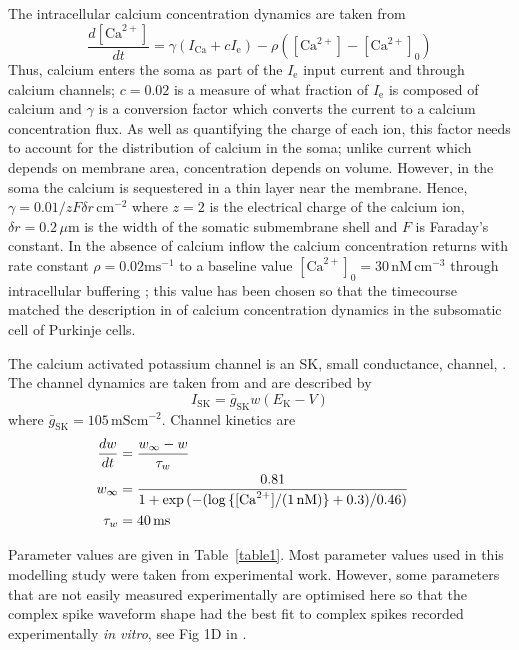 \documentclass[utf8]{frontiersSCNS} %
\newcommand{\msi}{\,\mathrm{mS cm^{-2}}}
\newcommand{\mse}{\,\mathrm{ms}}
\newcommand{\cm}{\,\mathrm{cm}}
\renewcommand{\k}{\mathrm{K}}
\newcommand{\ca}{\mathrm{Ca}}
\newcommand{\sk}{\mathrm{SK}}
\begin{document}
The intracellular calcium concentration dynamics are taken from
\cite{SterrattEtAl2012,KochSegev1998}
\begin{equation}
\label{eq:ca_concentration}
\frac{d[\ca^{2+}]}{dt}=\gamma (I_\ca+cI_{\mathrm{e}})  -
\rho ([\ca^{2+}]-[\ca^{2+}]_0)
\end{equation}
Thus, calcium enters the soma as part of the $I_\mathrm{e}$ input
current and through calcium channels; $c=0.02$ is a measure of what
fraction of $I_{\mathrm{e}}$ is composed of calcium and $\gamma$ is a
conversion factor which converts the current to a calcium
concentration flux. As well as quantifying the charge of each ion,
this factor needs to account for the distribution of calcium in the
soma; unlike current which depends on membrane area, concentration
depends on volume. However, in the soma the calcium is sequestered in
a thin layer near the membrane. Hence, $\gamma=0.01/zF\delta
r\,\mathrm{cm}^{-2}$ where $z=2$ is the electrical charge of the
calcium ion, $\delta r=0.2\,\mu\mathrm{m}$ is the width of the somatic
submembrane shell and $F$ is Faraday's constant. In the absence of
calcium inflow the calcium concentration returns with rate constant
$\rho=0.02\mathrm{ms}^{-1}$ to a baseline value $[\ca^{2+}]_0
=30\,\mathrm{nM}\cm^{-3}$ through intracellular buffering
\cite{FierroEtAl1998,AiraksinenEtAl1997}; this value has been chosen
so that the timecourse matched the description in
\cite{EilersEtAl1995} of calcium concentration dynamics in the
subsomatic cell of Purkinje cells.

The calcium activated potassium channel is an SK, small conductance,
channel, \cite{LancasterEtAl1991}. The channel dynamics are taken from
\cite{GilliesWillshaw2006} and are described by
\begin{equation}
\label{eq:I_SK}
I_{\sk} = {\bar{g}_{\sk}}w(E_\k-V)
\end{equation}
where $\bar{g}_\sk = 105\msi$. Channel kinetics are
\begin{align}
\label{eq:w_kinetics}
\frac{dw}{dt} &= \frac{w_\infty- w}{\tau_w}\cr
w_{\infty}   &= \frac{0.81}{1 + \exp{(-(\log{\{[\ca^{2+}]/(1\,\mathrm{nM})\}}+0.3)/0.46)}}\cr
\tau_w &= 40 \mse
\end{align}

Parameter values are given in Table~\ref{table1}. Most parameter
values used in this modelling study were taken from experimental
work. However, some parameters that are not easily measured
experimentally are optimised here so that the complex spike waveform
shape had the best fit to complex spikes recorded experimentally
\textit{in vitro}, see Fig 1D in \cite{DavieEtAl2008}.
\end{document}
